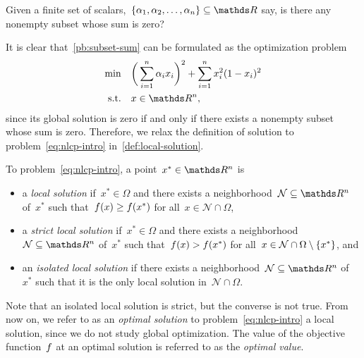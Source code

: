 \begin{problem}
    \label{pb:subset-sum}
    Given a finite set of scalars,~$\set{\alpha_1, \alpha_2, \dots, \alpha_n} \subseteq \R$ say, is there any nonempty subset whose sum is zero?
\end{problem}

It is clear that~\cref{pb:subset-sum} can be formulated as the optimization problem
\begin{equation*}
    \begin{aligned}
        \min        & \quad \bigg( \sum_{i = 1}^n \alpha_i x_i \bigg)^2 + \sum_{i = 1}^n x_i^2 (1 - x_i)^2\\
        \text{s.t.} & \quad x \in \R^n,
    \end{aligned}
\end{equation*}
since its global solution is zero if and only if there exists a nonempty subset whose sum is zero.
Therefore, we relax the definition of solution to problem~\cref{eq:nlcp-intro} in~\cref{def:local-solution}.

\begin{definition}
    \label{def:local-solution}
    To problem~\cref{eq:nlcp-intro}, a point~$x^{\ast} \in \R^n$ is
    \begin{itemize}
        \item a \emph{local solution} if~$x^{\ast} \in \Omega$ and there exists a neighborhood~$\mathcal{N} \subseteq \R^n$ of~$x^{\ast}$ such that~$f(x) \ge f(x^{\ast})$ for all~$x \in \mathcal{N} \cap \Omega$,
        \item a \emph{strict local solution} if~$x^{\ast} \in \Omega$ and there exists a neighborhood~$\mathcal{N} \subseteq \R^n$ of~$x^{\ast}$ such that~$f(x) > f(x^{\ast})$ for all~$x \in \mathcal{N} \cap \Omega \setminus \{x^{\ast}\}$, and
        \item an \emph{isolated local solution} if there exists a neighborhood~$\mathcal{N} \subseteq \R^n$ of~$x^{\ast}$ such that it is the only local solution in~$\mathcal{N} \cap \Omega$.
    \end{itemize}
\end{definition}

Note that an isolated local solution is strict, but the converse is not true.
From now on, we refer to as an \emph{optimal solution} to problem~\cref{eq:nlcp-intro} a local solution, since we do not study global optimization.
The value of the objective function~$f$ at an optimal solution is referred to as the \emph{optimal value}.

